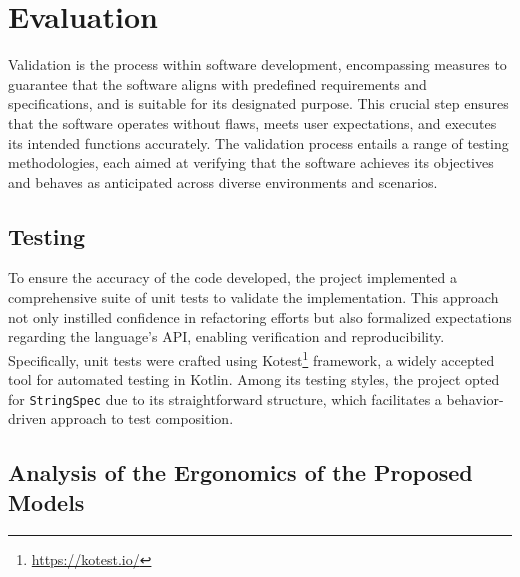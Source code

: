 
\chapter{Evaluation}
\label{chap:evaluation}

Validation is the process within software development, encompassing measures to guarantee that the software aligns with predefined requirements and specifications, and is suitable for its designated purpose. This crucial step ensures that the software operates without flaws, meets user expectations, and executes its intended functions accurately. The validation process entails a range of testing methodologies, each aimed at verifying that the software achieves its objectives and behaves as anticipated across diverse environments and scenarios.

\section{Testing}

To ensure the accuracy of the code developed, the project implemented a comprehensive suite of unit tests to validate the implementation. This approach not only instilled confidence in refactoring efforts but also formalized expectations regarding the language's API, enabling verification and reproducibility. Specifically, unit tests were crafted using Kotest\footnote{\url{https://kotest.io/}} framework, a widely accepted tool for automated testing in Kotlin. Among its testing styles, the project opted for \texttt{StringSpec} due to its straightforward structure, which facilitates a behavior-driven approach to test composition.



\section{Analysis of the Ergonomics of the Proposed Models}

